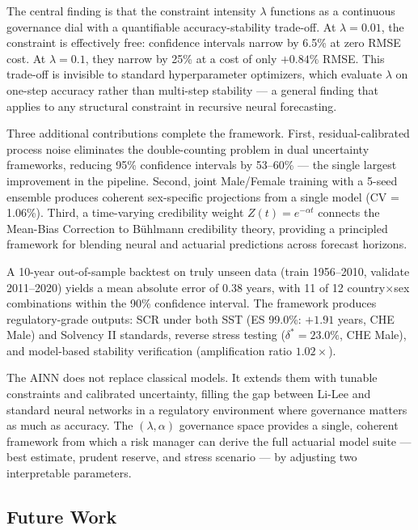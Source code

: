 \documentclass[11pt,a4paper]{article}
\begin{document}
The central finding is that the constraint intensity $\lambda$ functions as a continuous governance dial with a quantifiable accuracy-stability trade-off. At $\lambda = 0.01$, the constraint is effectively free: confidence intervals narrow by 6.5\% at zero RMSE cost. At $\lambda = 0.1$, they narrow by 25\% at a cost of only $+0.84\%$ RMSE. This trade-off is invisible to standard hyperparameter optimizers, which evaluate $\lambda$ on one-step accuracy rather than multi-step stability --- a general finding that applies to any structural constraint in recursive neural forecasting.

Three additional contributions complete the framework. First, residual-calibrated process noise eliminates the double-counting problem in dual uncertainty frameworks, reducing 95\% confidence intervals by 53--60\% --- the single largest improvement in the pipeline. Second, joint Male/Female training with a 5-seed ensemble produces coherent sex-specific projections from a single model (CV = 1.06\%). Third, a time-varying credibility weight $Z(t) = e^{-\alpha t}$ connects the Mean-Bias Correction to B\"uhlmann credibility theory, providing a principled framework for blending neural and actuarial predictions across forecast horizons.

A 10-year out-of-sample backtest on truly unseen data (train 1956--2010, validate 2011--2020) yields a mean absolute error of 0.38 years, with 11 of 12 country$\times$sex combinations within the 90\% confidence interval. The framework produces regulatory-grade outputs: SCR under both SST (ES 99.0\%: $+1.91$ years, CHE Male) and Solvency II standards, reverse stress testing ($\delta^* = 23.0\%$, CHE Male), and model-based stability verification (amplification ratio $1.02\times$).

The AINN does not replace classical models. It extends them with tunable constraints and calibrated uncertainty, filling the gap between Li-Lee and standard neural networks in a regulatory environment where governance matters as much as accuracy. The $(\lambda, \alpha)$ governance space provides a single, coherent framework from which a risk manager can derive the full actuarial model suite --- best estimate, prudent reserve, and stress scenario --- by adjusting two interpretable parameters.

\subsection{Future Work}
\end{document}
